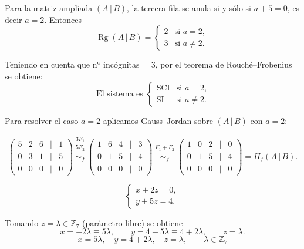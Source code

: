 \documentclass[a4paper,12pt]{article}
\begin{document}
\begin{ejercicio}[title=Ejercicio 30]
Para la matriz ampliada \((A\,|\,B)\), la tercera fila se anula si y sólo si \(a+5 = 0\), es decir \(a=2\). Entonces
\[
\operatorname{Rg}(A\,|\,B)=
\begin{cases}
2 & \text{si } a=2,\\[4pt]
3 & \text{si } a\neq 2.
\end{cases}
\]

\vspace{0.5em}

Teniendo en cuenta que nº incógnitas = 3, por el teorema de Rouché–Frobenius se obtiene:
\[
\boxed{\;
\text{El sistema es }\begin{cases}
\text{SCI} & \text{si } a=2,\\[4pt]
\text{SI} & \text{si } a\neq 2.
\end{cases}
}
\]

\bigskip

\noindent Para resolver el caso \(a=2\) aplicamos Gauss–Jordan sobre \((A\,|\,B)\) con \(a=2\):

\[
\begin{pmatrix}
5 & 2 & 6 &\Big|& 1\\
0 & 3 & 1 &\Big|& 5\\
0 & 0 & 0 &\Big|& 0
\end{pmatrix}
\overset{\substack{3F_1\\5F_2\\{}}}{\sim_f}
\begin{pmatrix}
1 & 6 & 4 &\Big|& 3\\
0 & 1 & 5 &\Big|& 4\\
0 & 0 & 0 &\Big|& 0
\end{pmatrix}
\overset{\substack{F_1+F_2\\{}}}{\sim_f}
\begin{pmatrix}
1 & 0 & 2 &\Big|& 0\\
0 & 1 & 5 &\Big|& 4\\
0 & 0 & 0 &\Big|& 0
\end{pmatrix}
= H_f(A\,|\,B).
\]

\[
\begin{cases}
x + 2z = 0,\\[4pt]
y + 5z = 4.
\end{cases}
\]

Tomando \(z=\lambda\in\mathbb{Z}_7\) (parámetro libre) se obtiene
\[
x = -2\lambda \equiv 5\lambda,\qquad
y = 4 - 5\lambda \equiv 4 + 2\lambda,\qquad
z = \lambda.
\]
\[
\boxed{\,x = 5\lambda,\quad y = 4+2\lambda,\quad z=\lambda,\qquad \lambda\in\mathbb{Z}_7\,}
\]
\end{ejercicio}
\end{document}
